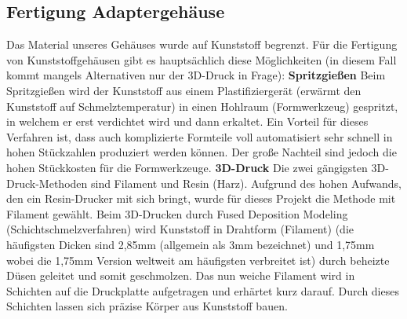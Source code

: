 \documentclass[11pt, twoside]{article}
\begin{document}
\subsection{Fertigung Adaptergehäuse}
Das Material unseres Gehäuses wurde auf Kunststoff begrenzt. Für die Fertigung von Kunststoffgehäusen gibt es hauptsächlich diese Möglichkeiten (in diesem Fall kommt mangels Alternativen nur der 3D-Druck in Frage): 
\vspace{4mm}\newline
\textbf{Spritzgießen} \newline
\glqq Beim Spritzgießen wird der Kunststoff aus einem Plastifiziergerät (erwärmt den Kunststoff auf Schmelztemperatur) in einen Hohlraum (Formwerkzeug) gespritzt, in welchem er erst verdichtet wird und dann erkaltet.\grqq \newline 
Ein Vorteil für dieses Verfahren ist, dass auch komplizierte Formteile voll automatisiert sehr schnell in hohen Stückzahlen produziert werden können.
Der große Nachteil sind jedoch die hohen Stückkosten für die Formwerkzeuge.\vspace{4mm}\newline 
\parencite[vgl.][]{noauthor_urlnl14_nodate}
\vspace{4mm}\newline
\textbf{3D-Druck} \newline
Die zwei gängigsten 3D-Druck-Methoden sind Filament und Resin (Harz). Aufgrund des hohen Aufwands, den ein Resin-Drucker mit sich bringt, wurde für dieses Projekt die Methode mit Filament gewählt. \newline
Beim 3D-Drucken durch Fused Deposition Modeling (Schichtschmelzverfahren) wird Kunststoff in Drahtform (Filament) (die häufigsten Dicken sind 2,85mm (allgemein als 3mm bezeichnet) und 1,75mm wobei die 1,75mm Version weltweit am häufigsten verbreitet ist) durch beheizte Düsen geleitet und somit geschmolzen. Das nun weiche Filament wird in Schichten auf die Druckplatte aufgetragen und erhärtet kurz darauf. Durch dieses Schichten lassen sich präzise Körper aus Kunststoff bauen.
\vspace{4mm}\newline
\parencite[vgl.][]{noauthor_urlnl15_nodate}\newline
\parencite[vgl.][]{noauthor_urlnl16_nodate}
\end{document}
